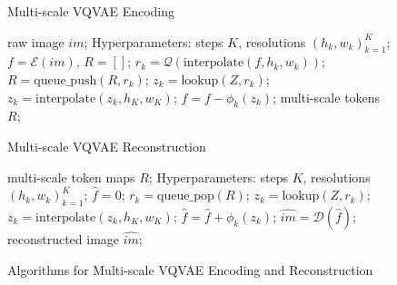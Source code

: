 \begin{figure}[htbp]
    \centering
    \begin{minipage}{0.45\textwidth}
        \centering
        \begin{algorithm}[H]
            \caption{Multi-scale VQVAE Encoding}
            \begin{algorithmic}[1]
                \Require raw image $im$; 
                \Require Hyperparameters: steps $K$, resolutions $(h_k, w_k)_{k=1}^K$;
                \State $f = \mathcal{E}(im)$, $R = []$;
                    \State $r_k = \mathcal{Q}(\text{interpolate}(f, h_k, w_k))$;
                    \State $R = \text{queue\_push}(R, r_k)$;
                    \State $z_k = \text{lookup}(Z, r_k)$;
                    \State $z_k = \text{interpolate}(z_k, h_K, w_K)$;
                    \State $f = f - \phi_k(z_k)$;
                \EndFor
                \Ensure multi-scale tokens $R$;
            \end{algorithmic}
        \end{algorithm}
    \end{minipage}\hfill
    \begin{minipage}{0.45\textwidth}
        \centering
        \begin{algorithm}[H]
            \caption{Multi-scale VQVAE Reconstruction}
            \begin{algorithmic}[1]
                \Require multi-scale token maps $R$;
                \Require Hyperparameters: steps $K$, resolutions $(h_k, w_k)_{k=1}^K$;
                \State $\hat{f} = 0$;
                    \State $r_k = \text{queue\_pop}(R)$;
                    \State $z_k = \text{lookup}(Z, r_k)$;
                    \State $z_k = \text{interpolate}(z_k, h_K, w_K)$;
                    \State $\hat{f} = \hat{f} + \phi_k(z_k)$;
                \EndFor
                \State $\hat{im} = \mathcal{D}(\hat{f})$;
                \Ensure reconstructed image $\hat{im}$;
            \end{algorithmic}
        \end{algorithm}
    \end{minipage}
    \caption{Algorithms for Multi-scale VQVAE Encoding and Reconstruction}
\end{figure}
